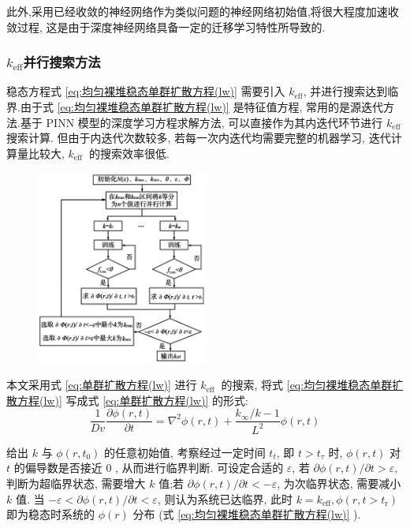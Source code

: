 \documentclass{Sichuan Normal University}
\begin{document}
此外,采用已经收敛的神经网络作为类似问题的神经网络初始值,将很大程度加速收敛过程, 这是由于深度神经网络具备一定的迁移学习特性所导致的.

\subsubsection{$k_{\text{eff}}$并行搜索方法}\label{sec:并行搜索方法}
稳态方程式 \eqref{eq:均匀裸堆稳态单群扩散方程(lw)} 需要引入 $k_{\mathrm{eff}}$, 并进行搜索达到临界.由于式 \eqref{eq:均匀裸堆稳态单群扩散方程(lw)} 是特征值方程, 常用的是源迭代方法.基于 PINN 模型的深度学习方程求解方法, 可以直接作为其内迭代环节进行 $k_{\mathrm{eff}}$ 搜索计算.
但由于内迭代次数较多, 若每一次内迭代均需要完整的机器学习, 迭代计算量比较大, $k_{\text {eff }}$ 的搜索效率很低.
\begin{figure}[H]
    \centering
    \includegraphics[width=0.5\textwidth]{./figure/k_eff并行搜索流程图.png} %
    \label{fig:k_eff并行搜索流程图}
\end{figure}

本文采用式 \eqref{eq:单群扩散方程(lw)} 进行 $k_{\text {eff }}$ 的搜索, 将式 \eqref{eq:均匀裸堆稳态单群扩散方程(lw)} 写成式 \eqref{eq:单群扩散方程(lw)} 的形式:
\begin{equation}
    \frac{1}{D v} \frac{\partial \phi(r, t)}{\partial t}=\nabla^2 \phi(r, t)+\frac{k_{\infty} / k-1}{L^2} \phi(r, t)
\label{eq:单群扩散方程(lw)2}
\end{equation}

给出 $k$ 与 $\phi\left(r, t_0\right)$ 的任意初始值, 考察经过一定时间 $t_t$, 即 $t>t_\tau$ 时, $\phi(r, t)$ 对 $t$ 的偏导数是否接近 0 , 从而进行临界判断.
可设定合适的 $\varepsilon$, 若 $\partial \phi(r, t) / \partial t>\varepsilon$, 判断为超临界状态, 需要增大 $k$ 值;若 $\partial \phi(r, t) / \partial t<-\varepsilon$, 为次临界状态, 需要减小 $k$ 值.
当 $-\varepsilon<\partial \phi(r, t) / \partial t<\varepsilon$, 则认为系统已达临界, 此时 $k=k_{\mathrm{eff}}, \phi\left(r, t>t_{\mathrm{r}}\right)$ 即为稳态时系统的 $\phi(r)$ 分布 (式 \eqref{eq:均匀裸堆稳态单群扩散方程(lw)} ).
\end{document}
